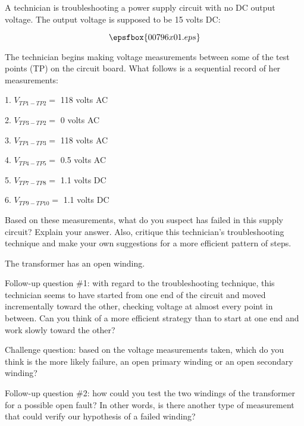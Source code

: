 

A technician is troubleshooting a power supply circuit with no DC output voltage.  The output voltage is supposed to be 15 volts DC:

$$\epsfbox{00796x01.eps}$$

The technician begins making voltage measurements between some of the test points (TP) on the circuit board.  What follows is a sequential record of her measurements:

\medskip
\goodbreak
\item{1.} $V_{TP1-TP2} =$ 118 volts AC
\item{2.} $V_{TP3-TP2} =$ 0 volts AC
\item{3.} $V_{TP1-TP3} =$ 118 volts AC
\item{4.} $V_{TP4-TP5} =$ 0.5 volts AC
\item{5.} $V_{TP7-TP8} =$ 1.1 volts DC
\item{6.} $V_{TP9-TP10} =$ 1.1 volts DC
\medskip

Based on these measurements, what do you suspect has failed in this supply circuit?  Explain your answer.  Also, critique this technician's troubleshooting technique and make your own suggestions for a more efficient pattern of steps.







The transformer has an open winding.  

\vskip 10pt

Follow-up question \#1: with regard to the troubleshooting technique, this technician seems to have started from one end of the circuit and moved incrementally toward the other, checking voltage at almost every point in between.  Can you think of a more efficient strategy than to start at one end and work slowly toward the other?

\vskip 10pt

Challenge question: based on the voltage measurements taken, which do you think is the more likely failure, an open primary winding or an open secondary winding?

\vskip 10pt

Follow-up question \#2: how could you test the two windings of the transformer for a possible open fault?  In other words, is there another type of measurement that could verify our hypothesis of a failed winding?

